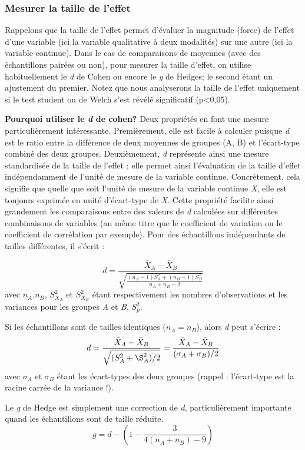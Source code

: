 \documentclass[
  11pt,
  french,
]{book}
\begin{document}
\hypertarget{sect04312}{%
\subsubsection{Mesurer la taille de l'effet}\label{sect04312}}

Rappelons que la taille de l'effet permet d'évaluer la magnitude (force) de l'effet d'une variable (ici la variable qualitative à deux modalités) sur une autre (ici la variable continue). Dans le cas de comparaisons de moyennes (avec des échantillons pairées ou non), pour mesurer la taille d'effet, on utilise habituellement le \emph{d} de Cohen ou encore le \emph{g} de Hedges; le second étant un ajustement du premier. Notez que nous analyserons la taille de l'effet uniquement si le test student ou de Welch s'est révélé significatif (p\textless0,05).

\textbf{Pourquoi utiliser le \emph{d} de cohen?} Deux propriétés en font une mesure particulièrement intéressante. Premièrement, elle est facile à calculer puisque \emph{d} est le ratio entre la différence de deux moyennes de groupes (A, B) et l'écart-type combiné des deux groupes. Deuxièmement, \emph{d} représente ainsi une mesure standardisée de la taille de l'effet ; elle permet ainsi l'évaluation de la taille d'effet indépendamment de l'unité de mesure de la variable continue. Concrètement, cela signifie que quelle que soit l'unité de mesure de la variable continue \emph{X}, elle est toujours exprimée en unité d'écart-type de \emph{X}. Cette propriété facilite ainsi grandement les comparaisons entre des valeurs de \emph{d} calculées sur différentes combinaisons de variables (au même titre que le coefficient de variation ou le coefficient de corrélation par exemple). Pour des échantillons indépendants de tailles différentes, il s'écrit :

\[d = \frac{\bar{X}_{A}-\bar{X}_{B}}{\sqrt{\frac{(n_A-1)S^2_A+(n_B-1)S^2_B}{n_A+n_B-2}}}\]
avec \(n_A\),\(n_B\), \(S^2_{X_A}\) et \(S^2_{X_B}\) étant respectivement les nombres d'observations et les variances pour les groupes \emph{A} et \emph{B}, \(S^2_p\).

Si les échantillons sont de tailles identiques (\(n_A=n_B\)), alors \emph{d} peut s'écrire :
\[d = \frac{\bar{X}_{A}-\bar{X}_{B}}{\sqrt{(S^2_A+\S^2_A)/2}} = \frac{\bar{X}_{A}-\bar{X}_{B}}{(\sigma_A+\sigma_B)/2}\]
avec \(\sigma_A\) et \(\sigma_B\) étant les écart-types des deux groupes (rappel : l'écart-type est la racine carrée de la variance !).

Le \emph{g} de Hedge est simplement une correction de \emph{d}, particulièrement importante quand les échantillons sont de taille réduite.
\[g = d- \left(1- \frac{3}{4(n_A+n_B)-9} \right)\]
\end{document}
